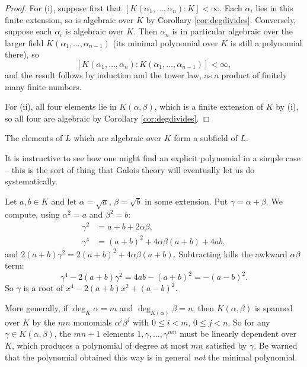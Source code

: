 \begin{proof}
	For (i), suppose first that $[K(\alpha_1, \dots, \alpha_n):K] < \infty$. Each $\alpha_i$ lies in this finite extension, so is algebraic over $K$ by Corollary \ref{cor:degdivides}. Conversely, suppose each $\alpha_i$ is algebraic over $K$. Then $\alpha_n$ is in particular algebraic over the larger field $K(\alpha_1, \dots, \alpha_{n-1})$ (its minimal polynomial over $K$ is still a polynomial there), so
	$$[K(\alpha_1, \dots, \alpha_n) : K(\alpha_1, \dots, \alpha_{n-1})] < \infty,$$
	and the result follows by induction and the tower law, as a product of finitely many finite numbers.

	For (ii), all four elements lie in $K(\alpha, \beta)$, which is a finite extension of $K$ by (i), so all four are algebraic by Corollary \ref{cor:degdivides}.
\end{proof}

\begin{corollary}
	The elements of $L$ which are algebraic over $K$ form a subfield of $L$.
\end{corollary}

It is instructive to see how one might find an explicit polynomial in a simple case -- this is the sort of thing that Galois theory will eventually let us do systematically.

\begin{example}
	Let $a, b \in K$ and let $\alpha = \sqrt a$, $\beta = \sqrt b$ in some extension. Put $\gamma = \alpha + \beta$. We compute, using $\alpha^2 = a$ and $\beta^2 = b$:
	\begin{align*}
		\gamma^2 &= a + b + 2\alpha\beta, \\
		\gamma^4 &= (a+b)^2 + 4\alpha\beta(a+b) + 4ab,
	\end{align*}
	and $2(a+b)\gamma^2 = 2(a+b)^2 + 4\alpha\beta(a+b)$. Subtracting kills the awkward $\alpha\beta$ term:
	$$\gamma^4 - 2(a+b)\gamma^2 = 4ab - (a+b)^2 = -(a-b)^2.$$
	So $\gamma$ is a root of $x^4 - 2(a+b)x^2 + (a-b)^2$.
\end{example}

More generally, if $\deg_K \alpha = m$ and $\deg_{K(\alpha)} \beta = n$, then $K(\alpha,\beta)$ is spanned over $K$ by the $mn$ monomials $\alpha^i \beta^j$ with $0 \leq i < m$, $0 \leq j < n$. So for any $\gamma \in K(\alpha,\beta)$, the $mn+1$ elements $1, \gamma, \dots, \gamma^{mn}$ must be linearly dependent over $K$, which produces a polynomial of degree at most $mn$ satisfied by $\gamma$. Be warned that the polynomial obtained this way is in general \emph{not} the minimal polynomial.

